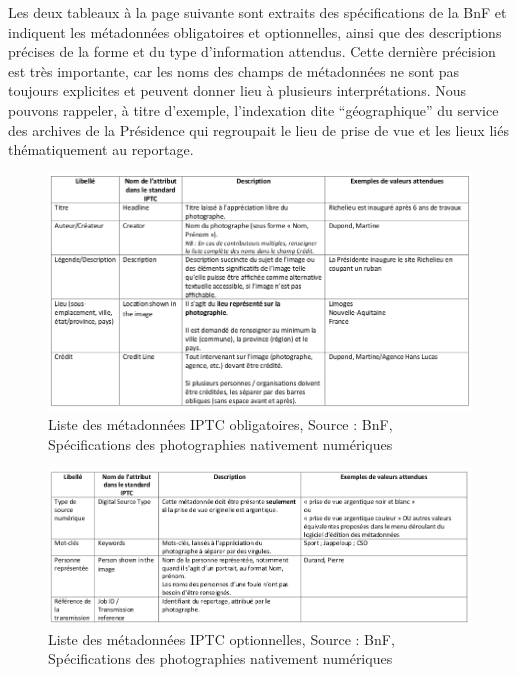 Les deux tableaux à la page suivante sont extraits des spécifications de la BnF et indiquent les métadonnées obligatoires et optionnelles, ainsi que des descriptions précises de la forme et du type d'information attendus. Cette dernière précision est très importante, car les noms des champs de métadonnées ne sont pas toujours explicites et peuvent donner lieu à plusieurs interprétations. Nous pouvons rappeler, à titre d'exemple, l'indexation dite \enquote{géographique} du service des archives de la Présidence qui regroupait le lieu de prise de vue et les lieux liés thématiquement au reportage. 

\newpage
\begin{figure}[h]
\begin{adjustbox}{width = \textwidth, center}
	\includegraphics{./img/spe_iptc_bnf.png}
\end{adjustbox}
\caption{Liste des métadonnées IPTC obligatoires, Source : BnF, Spécifications des photographies nativement numériques}
\end{figure}

\begin{figure}[h]
	\begin{adjustbox}{width = \textwidth, center}
		\includegraphics{./img/opt_iptc_bnf.png}
	\end{adjustbox}
	\caption{Liste des métadonnées IPTC optionnelles, Source : BnF, Spécifications des photographies nativement numériques}
\end{figure}
\newpage



